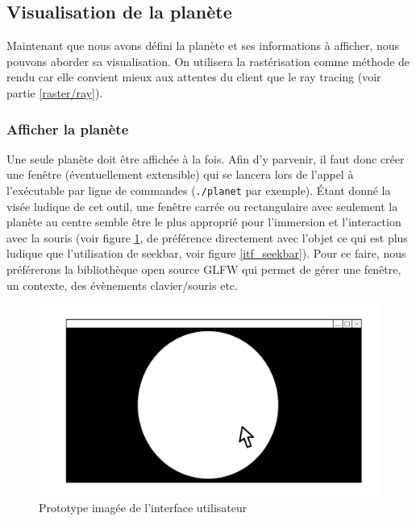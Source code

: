 \documentclass[a4paper]{article}
\begin{document}
\subsection{Visualisation de la planète}

        Maintenant que nous avons défini la planète et ses informations à afficher, nous pouvons aborder sa visualisation. On utilisera la rastérisation comme méthode de rendu car elle convient mieux aux attentes du client que le ray tracing (voir partie \ref{raster/ray}).

        \subsubsection{Afficher la planète} 
        
        Une seule planète doit être affichée à la fois. Afin d'y parvenir, il faut donc créer une fenêtre (éventuellement extensible) qui se lancera lors de l'appel à l'exécutable par ligne de commandes (\verb|./planet| par exemple). Étant donné la visée ludique de cet outil, une fenêtre carrée ou rectangulaire avec seulement la planète au centre semble être le plus approprié pour l'immersion et l'interaction avec la souris (voir figure \ref{itf_souris}, de préférence directement avec l'objet ce qui est plus ludique que l'utilisation de seekbar, voir figure \ref{itf_seekbar}). Pour ce faire, nous préférerons la bibliothèque open source GLFW qui permet de gérer une fenêtre, un contexte, des évènements clavier/souris etc.\\
  
         \begin{figure}[!h]
        \begin{center} \includegraphics[width=\linewidth]{img/interface_souris.png} \end{center}
        \caption{\label{itf_souris} Prototype imagée de l'interface utilisateur}
        \end{figure}
        
\end{document}
